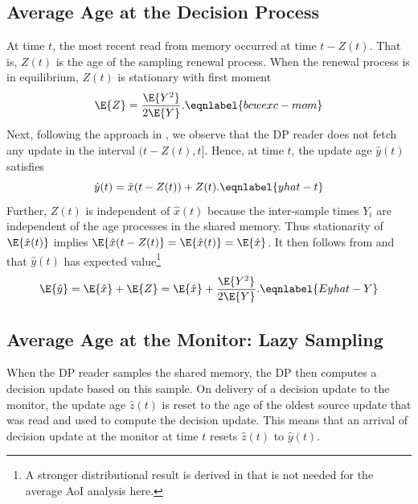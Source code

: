 \documentclass[conference, 10pt]{IEEEtran}
\newcommand{\maxage}{\hat{x}}
\newcommand{\dpage}{\hat{y}}
\newcommand{\monage}{\hat{z}}
\newcommand{\RY}[1]{\quad {\color{red} #1} \quad}
\newcommand{\V}[1]{\quad{\color{blue} #1}\quad}
\begin{document}
\subsection{Average Age at the Decision Process}
At %
time $t$, the most recent read from memory occurred at time $t-Z(t)$. That is,  $Z(t)$ is the age of the sampling renewal process.  When the renewal process is in equilibrium,  $Z(t)$ is stationary with first moment 
\cite[Theorem 5.7.4]{Gallager2013stochastic}
\begin{equation}
\E{Z} = \frac{\E{Y^2}}{2\E{Y}}. \eqnlabel{bcwexc-mom}
\end{equation}
Next, following the approach in \cite{Yates-IT2020}, we observe that the DP reader does not fetch any update in the interval $(t-Z(t),t]$. Hence, at time $t$, the update age $\dpage(t)$ satisfies
\begin{equation}
\dpage(t) = \maxage(t - Z(t)) + Z(t). \eqnlabel{yhat-t}
\end{equation}
Further, $Z(t)$ is independent of $\maxage(t)$ because the inter-sample times $Y_i$ are independent of the age processes in the shared memory. Thus 
 stationarity of $\E{\maxage(t)}$ implies 
 $\E{\maxage(t-Z(t)}=\E{\maxage(t)}=\E{\maxage}$. It then follows from  and  that $\dpage(t)$ has expected value\footnote{A stronger distributional result is derived in \cite[Theorem~6]{Yates-IT2020} that is not needed for the average AoI analysis here.}  
\begin{equation}
\E{\dpage} = \E{\maxage} + \E{Z}=\E{\maxage} + \frac{\E{Y^2}}{2\E{Y}}. \eqnlabel{Eyhat-Y}
\end{equation}


\subsection{Average Age at the Monitor: Lazy Sampling} 
When the DP reader samples the shared memory, the DP then computes a decision update based on this sample. On delivery of a decision update to the monitor, the update age $\monage(t)$ is reset to the age of the oldest source update that was read and used to compute the decision update. This means that an arrival of decision update at the monitor at time $t$ resets $\monage(t)$ to $\dpage(t)$. 
\end{document}
